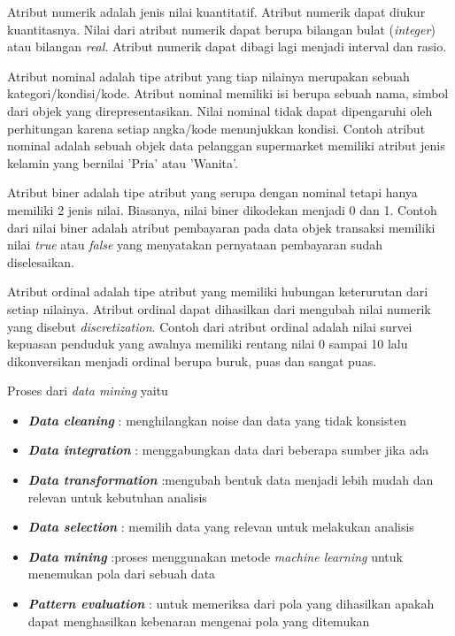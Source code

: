 \documentclass[a4paper,twoside]{article}
\begin{document}
\begin{enumerate}
Atribut numerik adalah jenis nilai kuantitatif. Atribut numerik dapat diukur kuantitasnya. Nilai dari atribut numerik dapat berupa bilangan bulat (\textit{integer}) atau bilangan \textit{real}. Atribut numerik dapat dibagi lagi menjadi interval dan rasio.   

Atribut nominal adalah tipe atribut yang tiap nilainya merupakan sebuah kategori/kondisi/kode. Atribut nominal memiliki isi berupa sebuah nama, simbol dari objek yang direpresentasikan. Nilai nominal tidak dapat dipengaruhi oleh perhitungan karena setiap angka/kode menunjukkan kondisi. Contoh atribut nominal adalah sebuah objek data pelanggan supermarket memiliki atribut jenis kelamin yang bernilai 'Pria' atau 'Wanita'.
 
Atribut biner adalah tipe atribut yang serupa dengan nominal tetapi hanya memiliki 2 jenis nilai. Biasanya, nilai biner dikodekan menjadi 0 dan 1. Contoh dari nilai biner adalah atribut pembayaran pada data objek transaksi memiliki nilai \textit{true} atau \textit{false} yang menyatakan pernyataan pembayaran sudah diselesaikan.

Atribut ordinal adalah tipe atribut yang memiliki hubungan keterurutan dari setiap nilainya. Atribut ordinal dapat dihasilkan dari mengubah nilai numerik yang disebut \textit{discretization}. Contoh dari atribut ordinal adalah nilai survei kepuasan penduduk yang awalnya memiliki rentang nilai 0 sampai 10 lalu dikonversikan menjadi ordinal berupa buruk, puas dan sangat puas.  

\pagebreak

 Proses dari \textit{data mining} yaitu 
\begin{itemize}
\item \textbf{\textit{Data cleaning}} : menghilangkan noise dan data yang tidak konsisten
\item \textbf{\textit{Data integration}} : menggabungkan data dari beberapa sumber jika ada
\item \textbf{\textit{Data transformation}} :mengubah bentuk data menjadi lebih mudah dan relevan untuk kebutuhan analisis
\item \textbf{\textit{Data selection}} : memilih data yang relevan untuk melakukan analisis
\item \textbf{\textit{Data mining}} :proses menggunakan metode \textit{machine learning} untuk menemukan pola dari sebuah data 
\item \textbf{\textit{Pattern evaluation}} : untuk memeriksa dari pola yang dihasilkan apakah dapat menghasilkan kebenaran mengenai pola yang ditemukan
\end{itemize}



\end{enumerate}
\end{document}
